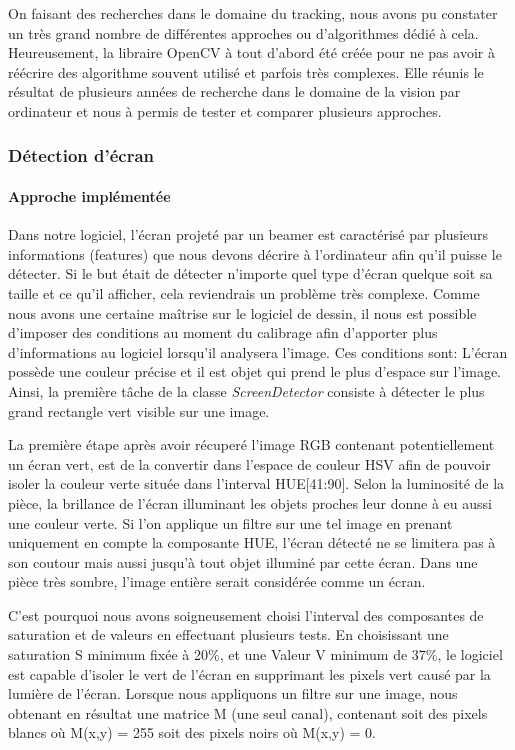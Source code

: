 \documentclass[11pt,a4paper,oldfontcommands]{memoir}
\begin{document}
On faisant des recherches dans le domaine du tracking, nous avons pu constater un très grand nombre de différentes approches ou d'algorithmes dédié à cela. Heureusement, la libraire OpenCV à  tout d'abord été créée pour ne pas avoir à réécrire des algorithme souvent utilisé et parfois très complexes. Elle réunis le résultat de plusieurs années de recherche dans le domaine de la vision par ordinateur et nous à permis de tester et comparer plusieurs approches.

\subsubsection{Détection d'écran}

\paragraph{Approche implémentée}

Dans notre logiciel, l'écran projeté par un beamer est caractérisé par plusieurs informations (features) que nous devons décrire à l'ordinateur afin qu'il puisse le détecter. Si le but était de détecter n'importe quel type d'écran quelque soit sa taille et ce qu'il afficher, cela reviendrais un problème très complexe. Comme nous avons une certaine maîtrise sur le logiciel de dessin, il nous est  possible d'imposer des conditions au moment du calibrage afin d'apporter plus d'informations au logiciel lorsqu'il analysera l'image. Ces conditions sont: L'écran possède une couleur précise et il est objet qui prend le plus d'espace sur l'image. Ainsi, la première tâche de la classe \textit{ScreenDetector} consiste à détecter le plus grand rectangle vert visible sur une image.

La première étape après avoir récuperé l'image RGB contenant potentiellement un écran vert, est de la convertir dans l'espace de couleur HSV afin de pouvoir isoler la couleur verte située dans l'interval HUE[41:90]. Selon la luminosité de la pièce, la brillance de l'écran illuminant les objets proches leur donne à eu aussi une couleur verte. Si l'on applique un filtre sur une tel image en prenant uniquement en compte la composante HUE, l'écran détecté ne se limitera pas à son coutour mais aussi jusqu'à tout objet illuminé par cette écran. Dans une pièce très sombre, l'image entière serait considérée comme un écran.

C'est pourquoi nous avons soigneusement choisi l'interval des composantes de saturation et de valeurs en effectuant plusieurs tests. En choisissant une saturation S minimum fixée à 20\%, et une Valeur V minimum de 37\%, le logiciel est capable d'isoler le vert de l'écran en supprimant les pixels vert causé par la lumière de l'écran. Lorsque nous appliquons un filtre sur une image, nous obtenant en résultat une matrice M (une seul canal), contenant soit des pixels blancs où M(x,y) = 255 soit des pixels noirs où M(x,y) = 0.
\end{document}
